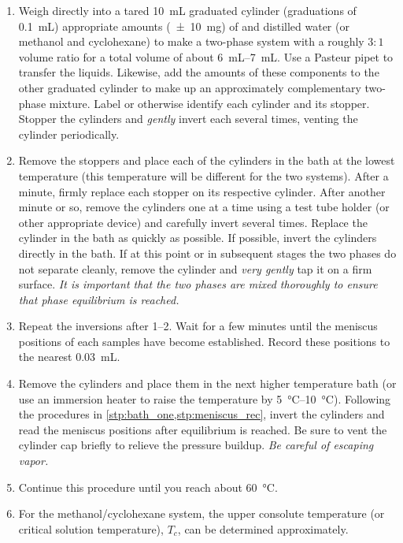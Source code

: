 \begin{enumerate}
	\item Weigh directly into a tared \qty{10}{\mL} graduated cylinder (graduations of \qty{0.1}{\mL}) appropriate amounts (\qty{\pm10}{\mg}) of  and distilled water (or methanol and cyclohexane) to make a two-phase system with a roughly \(3{:}1\) volume ratio for a total volume of about \qtyrange{6}{7}{\mL}.
	Use a Pasteur pipet to transfer the liquids. 
	Likewise, add the amounts of these components to the other graduated cylinder to make up an approximately complementary two-phase mixture. 
	Label or otherwise identify each cylinder and its stopper. 
	Stopper the cylinders and \emph{gently} invert each several times, venting the cylinder periodically. 
	\item Remove the stoppers and place each of the cylinders in the bath at the lowest temperature (this temperature will be different for the two systems). 
	After a minute, firmly replace each stopper on its respective cylinder. 
	After another minute or so, remove the cylinders one at a time using a test tube holder (or other appropriate device) and carefully invert several times. 
	Replace the cylinder in the bath as quickly as possible. 
	If possible, invert the cylinders directly in the bath. 
	If at this point or in subsequent stages the two phases do not separate cleanly, remove the cylinder and \emph{very gently} tap it on a firm surface. \emph{It is important that the two phases are mixed thoroughly to ensure that phase equilibrium is reached.}\label{stp:bath_one}
	\item Repeat the inversions after \qtyrange{1}{2}{\min}. 
	Wait for a few minutes until the meniscus positions of each samples have become established. 
	Record these positions to the nearest \qty{0.03}{\mL}.\label{stp:meniscus_rec}
	\item Remove the cylinders and place them in the next higher temperature bath (or use an immersion heater to raise the temperature by \qtyrange{5}{10}{\degreeCelsius}). 
	Following the procedures in \cref{stp:bath_one,stp:meniscus_rec}, invert the cylinders and read the meniscus positions after equilibrium is reached. 
	Be sure to vent the cylinder cap briefly to relieve the pressure buildup. 
	\emph{Be careful of escaping vapor.}
	\item Continue this procedure until you reach about \qty{60}{\degreeCelsius}.
	\item For the methanol/cyclohexane system, the upper consolute temperature (or critical solution temperature), \(T_c\), can be determined approximately. 

\end{enumerate}
